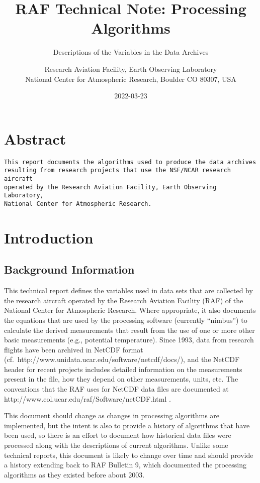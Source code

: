 \documentclass[
  english,
]{book}
\title{RAF Technical Note: Processing Algorithms}
\subtitle{Descriptions of the Variables in the Data Archives}
\author{Research Aviation Facility, Earth Observing Laboratory\\
National Center for Atmospheric Research, Boulder CO 80307, USA}
\date{2022-03-23}
\begin{document}
\maketitle

{
\setcounter{tocdepth}{1}
\tableofcontents
}
\hypertarget{index}{%
\chapter*{Abstract}\label{index}}

\begin{verbatim}
This report documents the algorithms used to produce the data archives 
resulting from research projects that use the NSF/NCAR research aircraft 
operated by the Research Aviation Facility, Earth Observing Laboratory, 
National Center for Atmospheric Research. 
\end{verbatim}

\hypertarget{introduction}{%
\chapter{Introduction}\label{introduction}}

\hypertarget{background-information}{%
\section{Background Information}\label{background-information}}

This technical report defines the variables used in data sets that are collected by the research aircraft operated by the Research Aviation Facility (RAF) of the National Center for Atmospheric Research. Where appropriate, it also documents the equations that are used by the processing software (currently ``nimbus'') to calculate the derived measurements that result from the use of one or more other basic measurements (e.g., potential temperature). Since 1993, data from research flights have been archived in NetCDF format (cf.~http://www.unidata.ucar.edu/software/netcdf/docs/), and the NetCDF header for recent projects includes detailed information on the measurements present in the file, how they depend on other measurements, units, etc. The conventions that the RAF uses for NetCDF data files are documented at http://www.eol.ucar.edu/raf/Software/netCDF.html .

This document should change as changes in processing algorithms are implemented, but the intent is also to provide a history of algorithms that have been used, so there is an effort to document how historical data files were processed along with the descriptions of current algorithms. Unlike some technical reports, this document is likely to change over time and should provide a history extending back to RAF Bulletin 9, which documented the processing algorithms as they existed before about 2003.
\end{document}
